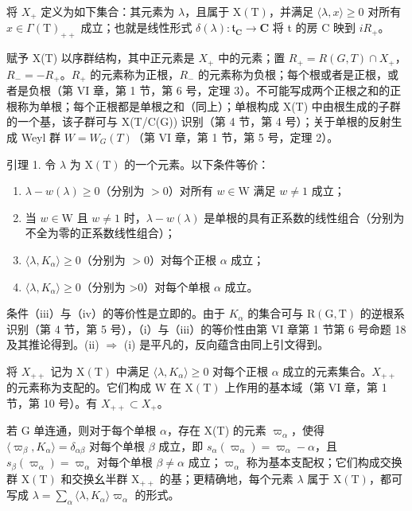 将 \(X_{+}\) 定义为如下集合：其元素为 \(\lambda\)，且属于 \(\mathrm{X(T)}\)，并满足 \(\langle\lambda,x\rangle\geq0\) 对所有 \(x\in\Gamma(\mathrm{T})_{++}\) 成立；也就是线性形式 \(\delta(\lambda):\mathfrak{t}_{\mathbf{C}}\to\mathbf{C}\) 将 t 的房 C 映到 \(iR_{+}\)。

赋予 X(T) 以序群结构，其中正元素是 \(X_{+}\) 中的元素；置 \(R_{+} = R(G, T) \cap X_{+}\)，\(R_{-} = -R_{+}\)。\(R_{+}\) 的元素称为正根，\(R_{-}\) 的元素称为负根；每个根或者是正根，或者是负根（第 VI 章，第 1 节，第 6 号，定理 3）。不可能写成两个正根之和的正根称为单根；每个正根都是单根之和（同上）；单根构成 X(T) 中由根生成的子群的一个基，该子群可与 X(T/C(G)) 识别（第 4 节，第 4 号）；关于单根的反射生成 Weyl 群 \(W = W_{G}(T)\)（第 VI 章，第 1 节，第 5 号，定理 2）。

引理 1. 令 \(\lambda\) 为 \(\mathrm{X(T)}\) 的一个元素。以下条件等价：

\begin{enumerate}
\def\labelenumi{(\roman{enumi})}
\item
  \(\lambda - w(\lambda) \geq 0\)（分别为 \(>0\)）对所有 \(w \in \mathrm{W}\) 满足 \(w \neq 1\) 成立；
\item
  当 \(w \in \mathrm{W}\) 且 \(w \neq 1\) 时，\(\lambda - w(\lambda)\) 是单根的具有正系数的线性组合（分别为不全为零的正系数线性组合）；
\item
  \(\langle \lambda, K_{\alpha} \rangle \geq 0\)（分别为 \(>0\)）对每个正根 \(\alpha\) 成立；
\item
  \(\langle\lambda,K_{\alpha}\rangle\geq0\)（分别为 >0）对每个单根 \(\alpha\) 成立。
\end{enumerate}

条件（iii）与（iv）的等价性是立即的。由于 \(K_{\alpha}\) 的集合可与 \(\mathrm{R}(\mathrm{G},\mathrm{T})\) 的逆根系识别（第 4 节，第 5 号），（i）与（iii）的等价性由第 VI 章第 1 节第 6 号命题 18 及其推论得到。(ii) \(\Rightarrow\) (i) 是平凡的，反向蕴含由同上引文得到。

将 \(X_{++}\) 记为 \(\mathrm{X(T)}\) 中满足 \(\langle\lambda,K_{\alpha}\rangle\geq0\) 对每个正根 \(\alpha\) 成立的元素集合。\(X_{++}\) 的元素称为支配的。它们构成 W 在 \(\mathrm{X(T)}\) 上作用的基本域（第 VI 章，第 1 节，第 10 号）。有 \(X_{++}\subset X_{+}\)。

若 G 单连通，则对于每个单根 \(\alpha\)，存在 X(T) 的元素 \(\varpi_{\alpha}\)，使得 \(\langle\varpi_{\beta}, K_{\alpha}\rangle = \delta_{\alpha\beta}\) 对每个单根 \(\beta\) 成立，即 \(s_{\alpha}(\varpi_{\alpha}) = \varpi_{\alpha} - \alpha\)，且 \(s_{\beta}(\varpi_{\alpha}) = \varpi_{\alpha}\) 对每个单根 \(\beta \neq \alpha\) 成立；\(\varpi_{\alpha}\) 称为基本支配权；它们构成交换群 \(\mathrm{X(T)}\) 和交换幺半群 \(\mathrm{X}_{++}\) 的基；更精确地，每个元素 \(\lambda\) 属于 \(\mathrm{X(T)}\)，都可写成 \(\lambda = \sum_{\alpha} \langle \lambda, K_{\alpha} \rangle \varpi_{\alpha}\) 的形式。

